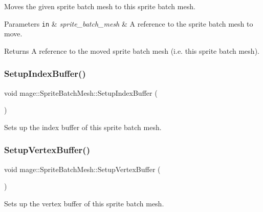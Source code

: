 Moves the given sprite batch mesh to this sprite batch mesh.


\begin{DoxyParams}[1]{Parameters}
\mbox{\tt in}  & {\em sprite\+\_\+batch\+\_\+mesh} & A reference to the sprite batch mesh to move. \\
\hline
\end{DoxyParams}
\begin{DoxyReturn}{Returns}
A reference to the moved sprite batch mesh (i.\+e. this sprite batch mesh). 
\end{DoxyReturn}
\hypertarget{classmage_1_1_sprite_batch_mesh_a628ab5a3dd2df0c624b7dc99bcff7f98}{}\label{classmage_1_1_sprite_batch_mesh_a628ab5a3dd2df0c624b7dc99bcff7f98} 
\subsubsection{\texorpdfstring{Setup\+Index\+Buffer()}{SetupIndexBuffer()}}
{\footnotesize\ttfamily void mage\+::\+Sprite\+Batch\+Mesh\+::\+Setup\+Index\+Buffer (\begin{DoxyParamCaption}{ }\end{DoxyParamCaption})\hspace{0.3cm}{\ttfamily [private]}}

Sets up the index buffer of this sprite batch mesh. \hypertarget{classmage_1_1_sprite_batch_mesh_ad3b68ac00e3dfb09ed495ce66f1d6fda}{}\label{classmage_1_1_sprite_batch_mesh_ad3b68ac00e3dfb09ed495ce66f1d6fda} 
\subsubsection{\texorpdfstring{Setup\+Vertex\+Buffer()}{SetupVertexBuffer()}}
{\footnotesize\ttfamily void mage\+::\+Sprite\+Batch\+Mesh\+::\+Setup\+Vertex\+Buffer (\begin{DoxyParamCaption}{ }\end{DoxyParamCaption})\hspace{0.3cm}{\ttfamily [private]}}

Sets up the vertex buffer of this sprite batch mesh. \hypertarget{classmage_1_1_sprite_batch_mesh_a48ed983397a37a5874101b49c040b78c}{}\label{classmage_1_1_sprite_batch_mesh_a48ed983397a37a5874101b49c040b78c} 
